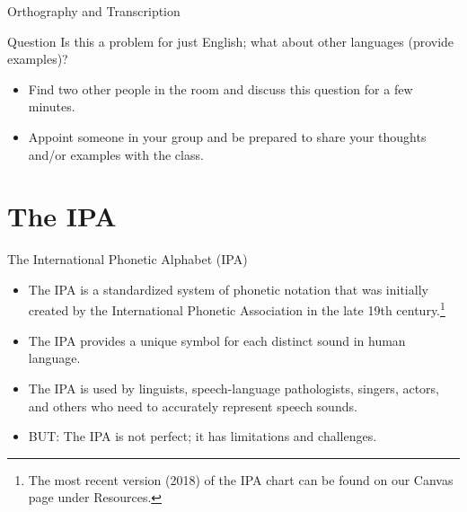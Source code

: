 \documentclass[professionalfonts]{beamer}
\begin{document}
\begin{frame}{Orthography and Transcription}
    \begin{block}{Question}
        Is this a problem for just English; what about other languages (provide examples)?
    \end{block}
    \begin{itemize}
        \item Find two other people in the room and discuss this question for a few minutes.
        \item Appoint someone in your group and be prepared to share your thoughts and/or examples with the class.
    \end{itemize}
\end{frame}

\section*{The IPA}
\begin{frame}{The International Phonetic Alphabet (IPA)}
    \begin{itemize}
        \item The IPA is a standardized system of phonetic notation that was initially created by the International Phonetic Association in the late 19th century.\footnote{The most recent version (2018) of the IPA chart can be found on our Canvas page under Resources.}
        \item The IPA provides a unique symbol for each distinct sound in human language.
        \item The IPA is used by linguists, speech-language pathologists, singers, actors, and others who need to accurately represent speech sounds.
        \item BUT: The IPA is not perfect; it has limitations and challenges.
    \end{itemize}
\end{frame}

\end{document}
